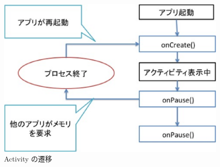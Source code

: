 \begin{figure}[t]
\begin{center}
\graphicspath{{./epsfiles/}}
\includegraphics[scale=0.3]{activity.eps}
\end{center}
\caption{Activity の遷移}
\label{activity}
\end{figure}



